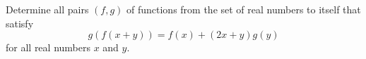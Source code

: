 Determine all pairs $(f, g)$ of functions from the set of real numbers to itself that satisfy
\[ g(f(x + y)) = f(x) + (2x + y)g(y) \]
for all real numbers $x$ and $y$.
